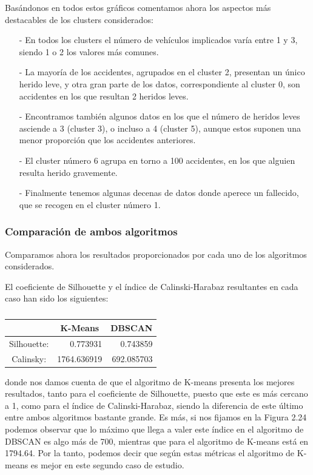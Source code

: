 \documentclass[a4paper,11pt]{book}
\begin{document}
Basándonos en todos estos gráficos comentamos ahora los aspectos más destacables de los clusters considerados:
\begin{itemize}
	\item[-] En todos los clusters el número de vehículos implicados varía entre 1 y 3, siendo 1 o 2 los valores más comunes.
	\item[-] La mayoría de los accidentes, agrupados en el cluster 2, presentan un único herido leve, y otra gran parte de los datos, correspondiente al cluster 0, son accidentes en los que resultan 2 heridos leves.
	\item [-] Encontramos también algunos datos en los que el número de heridos leves asciende a 3 (cluster 3), o incluso a 4 (cluster 5), aunque estos suponen una menor proporción que los accidentes anteriores. 
	\item [-] El cluster número 6 agrupa en torno a 100 accidentes, en los que alguien resulta herido gravemente.
	\item [-] Finalmente tenemos algunas decenas de datos donde aperece un fallecido, que se recogen en el cluster número 1. 
\end{itemize}


\newpage
\subsubsection{Comparación de ambos algoritmos}
Comparamos ahora los resultados proporcionados por cada uno de los algoritmos considerados. 

El coeficiente de Silhouette y el índice de Calinski-Harabaz resultantes en cada caso han sido los siguientes:

\begin{table}[htbp]
	\caption{}
	\begin{center}
		\begin{tabular}{|c|r|r|}
			\hline
			\textbf{} & \multicolumn{1}{c|}{\textbf{K-Means}} & \multicolumn{1}{c|}{\textbf{DBSCAN}} \\ \hline
			Silhouette:  & 0.773931 & 0.743859 \\ \hline
			Calinsky:  & 1764.636919 & 692.085703 \\ \hline
	\end{tabular}\end{center}
	\label{}
\end{table}

donde nos damos cuenta de que el algoritmo de K-means presenta los mejores resultados, tanto para el coeficiente de Silhouette, puesto que este es más cercano a 1, como para el índice de Calinski-Harabaz, siendo la diferencia de este último entre ambos algoritmos bastante grande. Es más, si nos fijamos en la Figura 2.24 podemos observar que lo máximo que llega a valer este índice en el algoritmo de DBSCAN es algo más de 700, mientras que para el algoritmo de K-means está en 1794.64. Por la tanto, podemos decir que según estas métricas el algoritmo de K-means es mejor en este segundo caso de estudio. 
\end{document}

